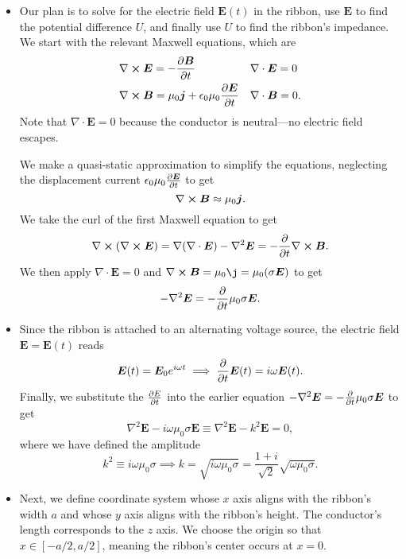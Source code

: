 \documentclass[11pt, a4paper]{article}
\renewcommand{\vec}[1]{\bm{#1}} %
\newcommand{\E}{\vec{E}}  %
\newcommand{\B}{\vec{B}}  %
\newcommand{\ee}{\epsilon_{0}}  %
\newcommand{\mm}{\mu_{0}}  %
\newcommand{\m}{\vec{m}}  %
\renewcommand{\div}{\nabla \cdot}
\renewcommand{\curl}{\nabla \cross}
\renewcommand{\grad}{\nabla}
\renewcommand{\laplacian}{\nabla^{2}}
\begin{document}
\begin{itemize}
	\item Our plan is to solve for the electric field $ \E(t) $ in the ribbon, use $ \E $ to find the potential difference $ U $, and finally use $ U $ to find the ribbon's impedance. We start with the relevant Maxwell equations, which are
	\begin{align*}
		& \curl \E = - \pdv{\B}{t} && \div \E = 0\\
		& \curl \B = \mm \vec{j} + \ee\mm \pdv{\E}{t} && \div \B = 0.
	\end{align*}
	Note that $ \div \E = 0 $ because the conductor is neutral---no electric field escapes.
	
	We make a quasi-static approximation to simplify the equations, neglecting the displacement current $  \ee\mm \pdv{\E}{t} $ to get
	\begin{equation*}
		 \curl \B \approx \mm \vec{j}.
	\end{equation*}
	We take the curl of the first Maxwell equation to get 
	\begin{equation*}
		\curl (\curl \E) = \grad (\div \E) - \laplacian \E  = - \pdv{t} \curl \B.
	\end{equation*}
	We then apply $ \div \E = 0 $ and $ \curl \B = \mm \j = \mm (\sigma \E) $ to get
	\begin{equation*}
		- \laplacian \E = - \pdv{t} \mm \sigma \E.
	\end{equation*}
	
	\item Since the ribbon is attached to an alternating voltage source, the electric field $ \E = \E(t) $ reads
	\begin{equation*}
		\E(t) = \E_{0} e^{i\omega t} \implies \pdv{t}\E(t) = i \omega \E(t).
	\end{equation*}
	Finally, we substitute the $ \pdv{E}{t} $ into the earlier equation $ - \laplacian \E = - \pdv{t} \mm \sigma \E $ to get
	\begin{equation*}
		\laplacian \E - i \omega \mm \sigma \E \equiv \laplacian \E - k^{2}\E = 0,
	\end{equation*}
	where we have defined the amplitude
	\begin{equation*}
		k^{2} \equiv i \omega \mm \sigma \implies k = \sqrt{i \omega \mm \sigma} = \frac{1 + i}{\sqrt{2}}\sqrt{\omega \mm \sigma}.
	\end{equation*}
	
	
	\item Next, we define coordinate system whose $ x $ axis aligns with the ribbon's width $ a $ and whose $ y $ axis aligns with the ribbon's height. The conductor's length corresponds to the $ z $ axis. We choose the origin so that $ x \in [-a/2, a/2] $, meaning the ribbon's center occurs at $ x = 0 $. 
	

\end{itemize}
\end{document}
